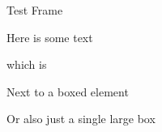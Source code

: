 \begin{frame}{Test Frame}
	\begin{element}[0.49]
		Here is some text

		which is 
	\end{element}
	\hfill
	\begin{boxedelement}[0.49]
		Next to a boxed element
	\end{boxedelement}
	
	\begin{boxedelement}
		Or also just a single large box
	\end{boxedelement}
\end{frame}